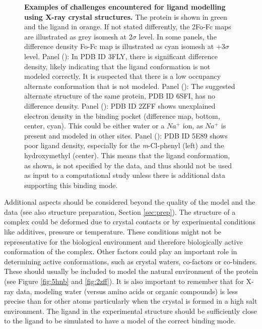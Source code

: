 \documentclass[9pt,bestpractices]{livecoms}
\begin{document}
\begin{figure}
    \caption{
    \textbf{Examples of challenges encountered for ligand modelling using X-ray crystal structures.}
    The protein is shown in green and the ligand in orange. If not stated differently, the 2Fo-Fc maps are illustrated as grey isomesh at $2\sigma$ level. In some panels, the difference density Fo-Fc map is illustrated as cyan isomesh at $+3\sigma$ level.
    Panel (): In PDB ID 3FLY, there is significant difference density, likely indicating that the ligand conformation is not modeled correctly.  It is suspected that there is a low occupancy alternate conformation that is not modeled.
    Panel (): The suggested alternate structure of the same protein, PDB ID 6SFI, has no difference density.
    Panel (): PDB ID 2ZFF shows unexplained electron density in the binding pocket (difference map, bottom, center, cyan). This could
    be either water or a $Na^+$ ion, as $Na^+$ is present and modeled in other sites. 
    Panel (): PDB ID 5E89 shows poor ligand density, especially for the \textit{m}-Cl-phenyl (left) and the hydroxymethyl (center). This means that the ligand conformation, as shown, is not specified by the data, and thus should not be used as input to a computational study unless there is additional data supporting this binding mode.
    }
    \label{fig:crystal2}
\end{figure}

Additional aspects should be considered beyond the quality of the model and the data (see also structure preparation, Section \ref{sec:prep}).
%
The structure of a complex could be deformed due to crystal contacts
or by experimental conditions like additives, pressure or temperature. These conditions might not be representative for the biological environment and therefore biologically active conformation of the complex. 
%
Other factors could play an important role in determining  active conformations, such as crystal waters, co-factors or co-binders. These should usually be included to model the natural environment of the protein (see Figure \ref{fig:5hnb} and \ref{fig:2zff}). It is also important to remember that for X-ray data, modeling water (versus amino acids or organic compounds) is less precise than for other atoms particularly when the crystal is formed in a high salt environment.
%
The ligand in the experimental structure should be sufficiently close to the ligand to be simulated to have a model of the correct binding mode.
\end{document}
